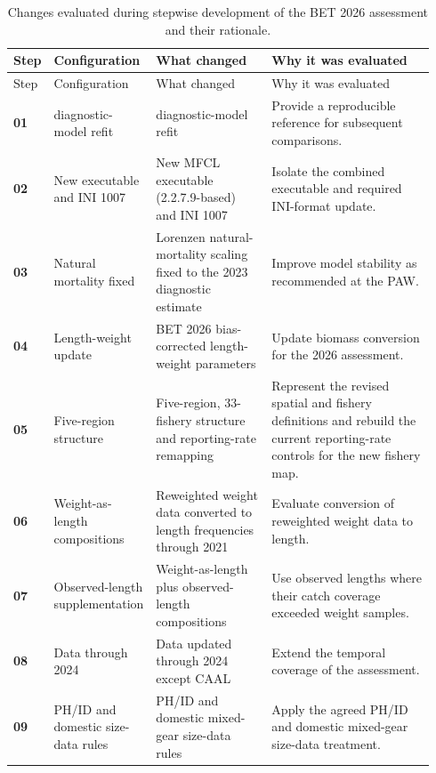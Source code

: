 \begingroup
\small
\setlength{\tabcolsep}{4pt}
\renewcommand{\arraystretch}{1.08}
\setlength{\LTcapwidth}{\linewidth}
\begin{longtable}{@{}>{\centering\arraybackslash}p{0.05\linewidth}>{\raggedright\arraybackslash}p{0.20\linewidth}>{\raggedright\arraybackslash}p{0.29\linewidth}>{\raggedright\arraybackslash}p{0.40\linewidth}@{}}
\caption{Changes evaluated during stepwise development of the BET 2026 assessment and their rationale.}\label{tab:bet-stepwise-development}\\
\toprule
Step & Configuration & What changed & Why it was evaluated \\
\midrule
\endfirsthead
\toprule
Step & Configuration & What changed & Why it was evaluated \\
\midrule
\endhead
\textbf{01} & 2023 diagnostic-model refit & 2023 diagnostic-model refit & Provide a reproducible reference for subsequent comparisons. \\
\textbf{02} & New executable and INI 1007 & New MFCL executable (2.2.7.9-based) and INI 1007 & Isolate the combined executable and required INI-format update. \\
\textbf{03} & Natural mortality fixed & Lorenzen natural-mortality scaling fixed to the 2023 diagnostic estimate & Improve model stability as recommended at the PAW. \\
\textbf{04} & Length-weight update & BET 2026 bias-corrected length-weight parameters & Update biomass conversion for the 2026 assessment. \\
\textbf{05} & Five-region structure & Five-region, 33-fishery structure and reporting-rate remapping & Represent the revised spatial and fishery definitions and rebuild the current reporting-rate controls for the new fishery map. \\
\textbf{06} & Weight-as-length compositions & Reweighted weight data converted to length frequencies through 2021 & Evaluate conversion of reweighted weight data to length. \\
\textbf{07} & Observed-length supplementation & Weight-as-length plus observed-length compositions & Use observed lengths where their catch coverage exceeded weight samples. \\
\textbf{08} & Data through 2024 & Data updated through 2024 except CAAL & Extend the temporal coverage of the assessment. \\
\textbf{09} & PH/ID and domestic size-data rules & PH/ID and domestic mixed-gear size-data rules & Apply the agreed PH/ID and domestic mixed-gear size-data treatment. \\

\end{longtable}
